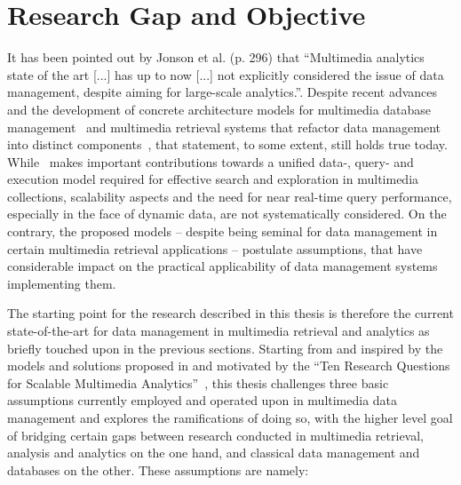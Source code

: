 \section{Research Gap and Objective}
\label{section:research_gap}

It has been pointed out by Jonson et al. \cite{Jonson:2016} (p. 296) that ``Multimedia analytics state of the art [...] has up to now [...] not explicitly considered the issue of data management, despite aiming for large-scale analytics.''. Despite recent advances and the development of concrete architecture models for multimedia database management~\cite{Giangreco:2016adam,Giangreco:2018Database} and multimedia retrieval systems that refactor data management into distinct components~\cite{Rossetto:2018thesis}, that statement, to some extent, still holds true today. While~\cite{Giangreco:2018Database} makes important contributions towards a unified data-, query- and execution model required for effective search and exploration in multimedia collections, scalability aspects and the need for near real-time query performance, especially in the face of dynamic data, are not systematically considered. On the contrary, the proposed models -- despite being seminal for data management in certain multimedia retrieval applications -- postulate assumptions, that have considerable impact on the practical applicability of data management systems implementing them.

The starting point for the research described in this thesis is therefore the current state-of-the-art for data management in multimedia retrieval and analytics as briefly touched upon in the previous sections. Starting from and inspired by the models and solutions proposed in \cite{Giangreco:2016adam,Giangreco:2018Database} and motivated by the ``Ten Research Questions for Scalable Multimedia Analytics''~\cite{Jonson:2016}, this thesis challenges three basic assumptions currently employed and operated upon in multimedia data management and explores the ramifications of doing so, with the higher level goal of bridging certain gaps between research conducted in multimedia retrieval, analysis and analytics on the one hand, and classical data management and databases on the other. These assumptions are namely:

